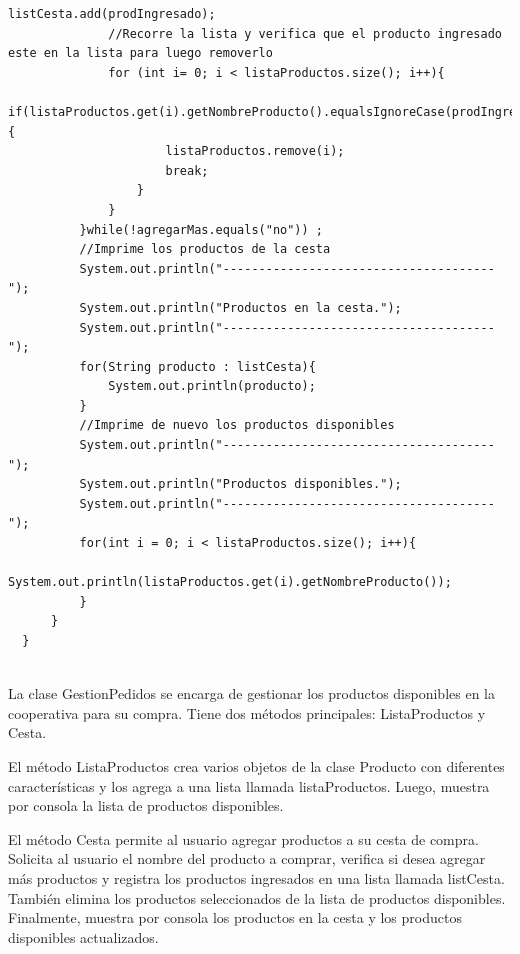 \documentclass[10pt,a4paper]{article}
\begin{document}
\begin{lstlisting}[style=Java]
              listCesta.add(prodIngresado);
              //Recorre la lista y verifica que el producto ingresado este en la lista para luego removerlo
              for (int i= 0; i < listaProductos.size(); i++){
                  if(listaProductos.get(i).getNombreProducto().equalsIgnoreCase(prodIngresado)){
                      listaProductos.remove(i);
                      break;
                  }
              }
          }while(!agregarMas.equals("no")) ;
          //Imprime los productos de la cesta
          System.out.println("--------------------------------------");
          System.out.println("Productos en la cesta.");
          System.out.println("--------------------------------------");
          for(String producto : listCesta){
              System.out.println(producto);
          } 
          //Imprime de nuevo los productos disponibles 
          System.out.println("--------------------------------------");
          System.out.println("Productos disponibles.");
          System.out.println("--------------------------------------");
          for(int i = 0; i < listaProductos.size(); i++){
              System.out.println(listaProductos.get(i).getNombreProducto());
          }
      }
  }
  
\end{lstlisting}

La clase GestionPedidos se encarga de gestionar los productos disponibles en la cooperativa para su compra. Tiene dos métodos principales: ListaProductos y Cesta.

El método ListaProductos crea varios objetos de la clase Producto con diferentes características y los agrega a una lista llamada listaProductos. Luego, muestra por consola la lista de productos disponibles.

El método Cesta permite al usuario agregar productos a su cesta de compra. Solicita al usuario el nombre del producto a comprar, verifica si desea agregar más productos y registra los productos ingresados en una lista llamada listCesta. También elimina los productos seleccionados de la lista de productos disponibles. Finalmente, muestra por consola los productos en la cesta y los productos disponibles actualizados.
\end{document}
